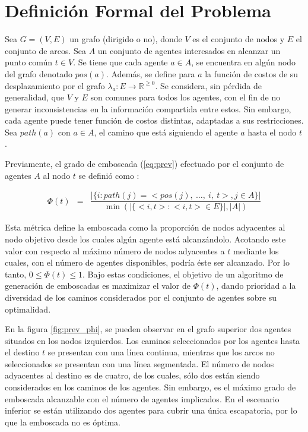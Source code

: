 \section{Definici\'on Formal del Problema}
\label{sec:definition}

Sea $G = (V,E)$ un grafo (dirigido o no), donde $V$ es el conjunto de
nodos y $E$ el conjunto de arcos. Sea $A$ un conjunto de agentes
interesados en alcanzar un punto com\'un $t \in V$. Se tiene
que cada agente $a \in A$, se encuentra en algún nodo del grafo
denotado $pos(a)$. Además, se define para $a$ la función
de costos de su desplazamiento por el grafo
$\lambda_a : E \longrightarrow \mathbb{R}^{\geq 0}$.
Se considera, sin pérdida de generalidad, que $V$ y $E$ son comunes para
todos los agentes, con el fin de no generar inconsistencias en la
información compartida entre estos. Sin embargo, cada agente puede tener
función de costos distintas, adaptadas a sus restricciones.
Sea $path(a)$ con $a \in A$, el camino que está siguiendo el agente
$a$ hasta el nodo $t$.

Previamente, el grado de emboscada (\ref{eq:prev})
efectuado por el conjunto de agentes
$A$ al nodo $t$ se defini\'o como \cite{FGC12e}\cite{FGC12}:

\begin{small}
\begin{eqnarray}
 \Phi(t) &=& 
 \dfrac{|\{ i : path(j) = <pos(j),\ \ldots,\ i,\ t>, j \in A\}|}
	  {\min(|\{ <i,t> : <i,t> \in E \} |,|A|) }
\label{eq:prev}
\end{eqnarray}
\end{small}

Esta m\'etrica define la emboscada como la proporción de nodos adyacentes
al nodo objetivo desde los cuales algún agente está alcanzándolo. Acotando
este valor con res\-pec\-to al m\'aximo n\'umero de nodos adyacentes a $t$ mediante
los cuales, con el n\'umero de agentes disponibles, podr\'ia \'este ser alcanzado.
Por lo tanto, $0 \leq \Phi(t) \leq 1$. Bajo estas condiciones, el objetivo
de un algoritmo de generaci\'on de emboscadas es maximizar el
valor de $\Phi(t)$, dando prioridad a la diversidad de los caminos
considerados por el conjunto de agentes sobre su optimalidad.

En la figura \ref{fig:prev_phi}, se pueden observar en el grafo
superior dos agentes situados en los nodos izquierdos. Los caminos
seleccionados por los agentes hasta el destino $t$ se presentan con
una l\'inea continua, mientras que los arcos no seleccionados se
presentan con una l\'inea segmentada. El n\'umero de nodos adyacentes
al destino es de cuatro, de los cuales, s\'olo dos están siendo
considerados en los caminos de los agentes. Sin embargo, es el m\'aximo
grado de emboscada alcanzable con el n\'umero de agentes implicados.
En el escenario inferior se est\'an utilizando dos agentes para cubrir
una \'unica escapatoria, por lo que la emboscada no es \'optima.

